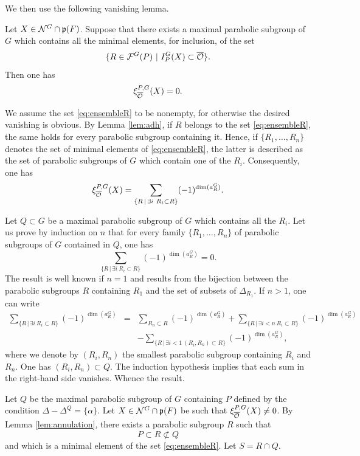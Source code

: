 \begin{paragr}
\begin{preuve}
We then use the following vanishing lemma.

\begin{lemme}\label{lem:annulation}
  Let $X\in \mathcal{N}^G\cap \mathfrak{p}(F)$. Suppose that there exists a maximal parabolic subgroup of $G$ which contains all the minimal elements, for inclusion, of the set
  \begin{equation}
    \label{eq:ensembleR}
    \{R\in \mathcal{F}^G(P)\ |\ I_P^G(X)\subset \overline{\mathcal{O}}\}.
  \end{equation}
Then one has
$$\xi_{\overline{\mathcal{O}}}^{P,G}(X)=0.$$
\end{lemme}

\begin{preuve}
  We assume the set \eqref{eq:ensembleR} to be nonempty, for otherwise the desired vanishing is obvious. By Lemma \ref{lem:adh}, if $R$ belongs to the set \eqref{eq:ensembleR}, the same holds for every parabolic subgroup containing it. Hence, if $\{R_1,\ldots,R_n\}$ denotes the set of minimal elements of \eqref{eq:ensembleR}, the latter is described as the set of parabolic subgroups of $G$ which contain one of the $R_i$. Consequently, one has
$$\xi_{\overline{\mathcal{O}}}^{P,G}(X)=\sum_{\{R\,|\, \exists i\ R_i\subset R\}} (-1)^{\dim(a_R^G)}.$$

Let $Q\subset G$ be a maximal parabolic subgroup of $G$ which contains all the $R_i$. Let us prove by induction on $n$ that for every family $\{R_1,\ldots,R_n\}$ of parabolic subgroups of $G$ contained in $Q$, one has
$$\sum_{\{R\,|\, \exists i\ R_i\subset R\}} (-1)^{\dim(a_R^G)}=0.$$
The result is well known if $n=1$ and results from the bijection between the parabolic subgroups $R$ containing $R_1$ and the set of subsets of $\Delta_{R_1}$. If $n>1$, one can write
\begin{eqnarray*}
  \sum_{\{R\,|\, \exists i\ R_i\subset R\}} (-1)^{\dim(a_R^G)}&=&\sum_{R_n\subset R} (-1)^{\dim(a_R^G)}+\sum_{\{R\,|\, \exists i<n\ R_i\subset R\}} (-1)^{\dim(a_R^G)}\\
  &&-\sum_{\{R\,|\, \exists i<1\ (R_i,R_n)\subset R\}} (-1)^{\dim(a_R^G)},
\end{eqnarray*}
where we denote by $(R_i,R_n)$ the smallest parabolic subgroup containing $R_i$ and $R_n$. One has $(R_i,R_n)\subset Q$. The induction hypothesis implies that each sum in the right-hand side vanishes. Whence the result.
\end{preuve}

Let $Q$ be the maximal parabolic subgroup of $G$ containing $P$ defined by the condition $\Delta-\Delta^Q=\{\alpha\}$. Let $X\in \mathcal{N}^G\cap \mathfrak{p}(F)$ be such that $\xi_{\overline{\mathcal{O}}}^{P,G}(X)\neq 0$. By Lemma \ref{lem:annulation}, there exists a parabolic subgroup $R$ such that
$$P\subset R\not\subset Q$$
and which is a minimal element of the set \eqref{eq:ensembleR}. Let $S=R\cap Q$.


\end{preuve}
\end{paragr}
